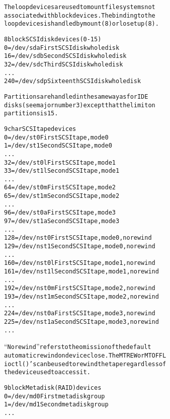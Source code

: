 \documentclass[a4paper,8pt,english]{sphinxmanual}
\begin{document}
\begin{alltt}
                The loop devices are used to mount filesystems not
                associated with block devices.  The binding to the
                loop devices is handled by mount(8) or losetup(8).

   8 block      SCSI disk devices (0-15)
                  0 = /dev/sda          First SCSI disk whole disk
                 16 = /dev/sdb          Second SCSI disk whole disk
                 32 = /dev/sdc          Third SCSI disk whole disk
                    ...
                240 = /dev/sdp          Sixteenth SCSI disk whole disk

                Partitions are handled in the same way as for IDE
                disks (see major number 3) except that the limit on
                partitions is 15.

   9 char       SCSI tape devices
                  0 = /dev/st0          First SCSI tape, mode 0
                  1 = /dev/st1          Second SCSI tape, mode 0
                    ...
                 32 = /dev/st0l         First SCSI tape, mode 1
                 33 = /dev/st1l         Second SCSI tape, mode 1
                    ...
                 64 = /dev/st0m         First SCSI tape, mode 2
                 65 = /dev/st1m         Second SCSI tape, mode 2
                    ...
                 96 = /dev/st0a         First SCSI tape, mode 3
                 97 = /dev/st1a         Second SCSI tape, mode 3
                      ...
                128 = /dev/nst0         First SCSI tape, mode 0, no rewind
                129 = /dev/nst1         Second SCSI tape, mode 0, no rewind
                    ...
                160 = /dev/nst0l        First SCSI tape, mode 1, no rewind
                161 = /dev/nst1l        Second SCSI tape, mode 1, no rewind
                    ...
                192 = /dev/nst0m        First SCSI tape, mode 2, no rewind
                193 = /dev/nst1m        Second SCSI tape, mode 2, no rewind
                    ...
                224 = /dev/nst0a        First SCSI tape, mode 3, no rewind
                225 = /dev/nst1a        Second SCSI tape, mode 3, no rewind
                    ...

                ``No rewind'' refers to the omission of the default
                automatic rewind on device close.  The MTREW or MTOFFL
                ioctl()'s can be used to rewind the tape regardless of
                the device used to access it.

   9 block      Metadisk (RAID) devices
                  0 = /dev/md0          First metadisk group
                  1 = /dev/md1          Second metadisk group
                    ...


\end{alltt}
\end{document}
